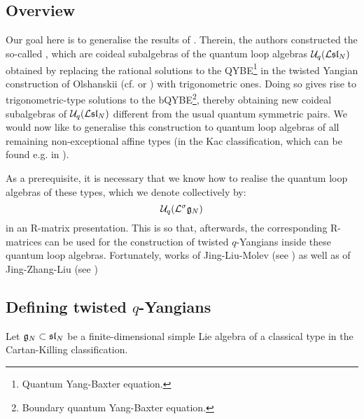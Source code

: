     \subsection{Overview}
        Our goal here is to generalise the results of \cite{molev_ragoucy_sorba_twisted_q_yangians_type_A}. Therein, the authors constructed the so-called , which are coideal subalgebras of the quantum loop algebras $\mathcal{U}_q(\mathcal{L}\mathfrak{sl}_N)$ obtained by replacing the rational solutions to the QYBE\footnote{Quantum Yang-Baxter equation.} in the twisted Yangian construction of Olshanskii (cf. \cite{olshanski_twisted_yangians_and_infinite_dimensional_classical_lie_algebras} or \cite[Chapter 2]{molev_yangians_and_classical_lie_algebras}) with trigonometric ones. Doing so gives rise to trigonometric-type solutions to the bQYBE\footnote{Boundary quantum Yang-Baxter equation.}, thereby obtaining new coideal subalgebras of $\mathcal{U}_q(\mathcal{L}\mathfrak{sl}_N)$ different from the usual quantum symmetric pairs. We would now like to generalise this construction to quantum loop algebras of all remaining non-exceptional affine types (in the Kac classification, which can be found e.g. in \cite[Chapter 4]{kac_infinite_dimensional_lie_algebras}). 
        
        As a prerequisite, it is necessary that we know how to realise the quantum loop algebras of these types, which we denote collectively by:
            $$\mathcal{U}_q(\mathcal{L}^{\sigma}\mathfrak{g}_N)$$
        in an R-matrix presentation. This is so that, afterwards, the corresponding R-matrices can be used for the construction of twisted $q$-Yangians inside these quantum loop algebras. Fortunately, works of Jing-Liu-Molev (see ) as well as of Jing-Zhang-Liu (see \cite{jing_zhang_liu_R_matrix_presentation_for_twisted_affine_QUEs})

    \subsection{\texorpdfstring{Defining twisted $q$-Yangians}{}}
        Let $\mathfrak{g}_N \subset \mathfrak{sl}_N$ be a finite-dimensional simple Lie algebra of a classical type in the Cartan-Killing classification.
    
